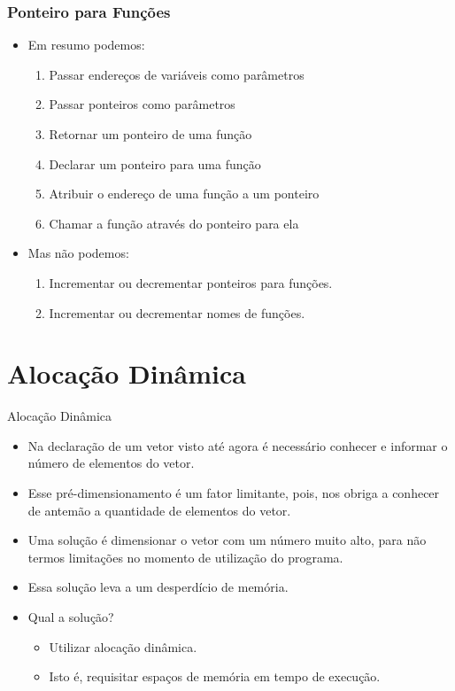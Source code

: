 \begin{frame}[fragile,c]
\frametitle{Ponteiro para Funções}
\begin{itemize}
  \item Em resumo podemos:  
    \begin{enumerate}
      \item Passar endereços de variáveis como parâmetros
      \item Passar ponteiros como parâmetros
      \item Retornar um ponteiro de uma função

      \item Declarar um ponteiro para uma função

      \item Atribuir o endereço de uma função a um ponteiro

      \item Chamar a função através do ponteiro para ela

    \end{enumerate}

  \item Mas não podemos:  

    \begin{enumerate}
      \item Incrementar ou decrementar ponteiros para funções.
      \item Incrementar ou decrementar nomes de funções.
    \end{enumerate} 

\end{itemize}

\end{frame}

\section{Alocação Dinâmica}
\begin{frame}[c]{Alocação Dinâmica}
  \begin{itemize}[<+->]
    \item Na declaração de um vetor visto até agora é necessário conhecer e informar o número de elementos do vetor.
    \item Esse pré-dimensionamento é um fator limitante, pois, nos obriga a conhecer de antemão a quantidade de elementos do vetor.
    \item Uma solução é dimensionar o vetor com um número muito alto, para não termos limitações no momento de utilização do programa.
    \item Essa solução leva a um desperdício de memória.
    \item Qual a solução?   
    \begin{itemize}[<+->]
      \item Utilizar alocação dinâmica.
      \item Isto é, requisitar espaços de memória em tempo de execução.
    \end{itemize}
  \end{itemize}
\end{frame}

